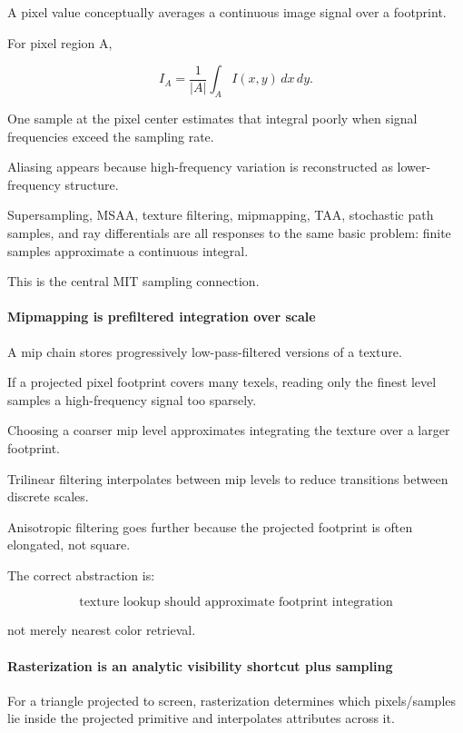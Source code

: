 A pixel value conceptually averages a continuous image signal over a footprint.

For pixel region A,

\[
I_A
=
\frac{1}{|A|}
\int_A I(x,y)\,dx\,dy.
\]

One sample at the pixel center estimates that integral poorly when signal frequencies exceed the sampling rate.

Aliasing appears because high-frequency variation is reconstructed as lower-frequency structure.

Supersampling, MSAA, texture filtering, mipmapping, TAA, stochastic path samples, and ray differentials are all responses to the same basic problem: finite samples approximate a continuous integral.

This is the central MIT sampling connection.

\paragraph{Mipmapping is prefiltered integration over scale}\label{mipmapping-is-prefiltered-integration-over-scale}

A mip chain stores progressively low-pass-filtered versions of a texture.

If a projected pixel footprint covers many texels, reading only the finest level samples a high-frequency signal too sparsely.

Choosing a coarser mip level approximates integrating the texture over a larger footprint.

Trilinear filtering interpolates between mip levels to reduce transitions between discrete scales.

Anisotropic filtering goes further because the projected footprint is often elongated, not square.

The correct abstraction is:

\[
\boxed{
\text{texture lookup should approximate footprint integration}
}
\]

not merely nearest color retrieval.

\paragraph{Rasterization is an analytic visibility shortcut plus sampling}\label{rasterization-is-an-analytic-visibility-shortcut-plus-sampling}

For a triangle projected to screen, rasterization determines which pixels/samples lie inside the projected primitive and interpolates attributes across it.

